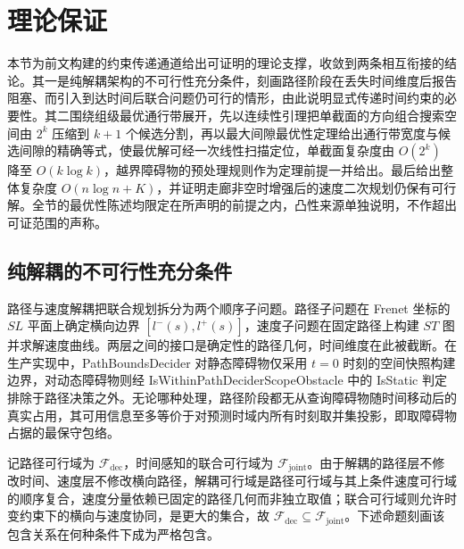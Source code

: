 \documentclass[a4paper,11pt]{ctexart}
\theoremstyle{definition}
\begin{document}
\makeatletter
{}
\makeatother

\section{理论保证}
\label{sec:theory}

本节为前文构建的约束传递通道给出可证明的理论支撑，收敛到两条相互衔接的结论。其一是纯解耦架构的不可行性充分条件，刻画路径阶段在丢失时间维度后报告阻塞、而引入到达时间后联合问题仍可行的情形，由此说明显式传递时间约束的必要性。其二围绕组级最优通行带展开，先以连续性引理把单截面的方向组合搜索空间由 $2^k$ 压缩到 $k+1$ 个候选分割，再以最大间隙最优性定理给出通行带宽度与候选间隙的精确等式，使最优解可经一次线性扫描定位，单截面复杂度由 $O(2^k)$ 降至 $O(k\log k)$，越界障碍物的预处理规则作为定理前提一并给出。最后给出整体复杂度 $O(n\log n + K)$，并证明走廊非空时增强后的速度二次规划仍保有可行解。全节的最优性陈述均限定在所声明的前提之内，凸性来源单独说明，不作超出可证范围的声称。

\subsection{纯解耦的不可行性充分条件}
\label{sec:thy_infeasible}

路径与速度解耦把联合规划拆分为两个顺序子问题。路径子问题在 Frenet 坐标的 $SL$ 平面上确定横向边界 $[l^{-}(s), l^{+}(s)]$，速度子问题在固定路径上构建 $ST$ 图并求解速度曲线。两层之间的接口是确定性的路径几何，时间维度在此被截断。在生产实现中，PathBoundsDecider 对静态障碍物仅采用 $t{=}0$ 时刻的空间快照构建边界，对动态障碍物则经 IsWithinPathDeciderScopeObstacle 中的 IsStatic 判定排除于路径决策之外。无论哪种处理，路径阶段都无从查询障碍物随时间移动后的真实占用，其可用信息至多等价于对预测时域内所有时刻取并集投影，即取障碍物占据的最保守包络。

记路径可行域为 $\mathcal{F}_{\text{dec}}$，时间感知的联合可行域为 $\mathcal{F}_{\text{joint}}$。由于解耦的路径层不修改时间、速度层不修改横向路径，解耦可行域是路径可行域与其上条件速度可行域的顺序复合，速度分量依赖已固定的路径几何而非独立取值；联合可行域则允许时变约束下的横向与速度协同，是更大的集合，故 $\mathcal{F}_{\text{dec}} \subseteq \mathcal{F}_{\text{joint}}$。下述命题刻画该包含关系在何种条件下成为严格包含。
\end{document}
